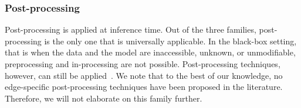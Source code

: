\subsubsection{Post-processing}
\label{ssub:dq:solution:post}

Post-processing is applied  at inference time.
Out of the three families, post-processing is the only one
that is universally applicable.
In the black-box setting, that is when the data and the model
are inaccessible, unknown, or unmodifiable,
preprocessing and in-processing are not possible.
Post-processing techniques, however, can still be applied~\cite{%
	bolukbasiManComputerProgrammer2016,%
	hardtEqualityOpportunitySupervised2016,%
	petersenPostprocessingIndividualFairness2021%
}.
We note that to the best of our knowledge, no edge-specific
post-processing techniques have been proposed in the literature.
Therefore, we will not elaborate on this family further.
